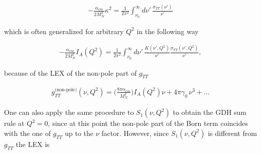 \documentclass[prc,twocolumn,showpacs,preprintnumbers,amsmath,amssymb
,superscriptaddress,a4paper,nofootinbib
]{revtex4-1}
\begin{document}
\begin{align}
-\frac{\alpha_{em}}{2 M_N^2}\kappa^2 = \frac{1}{2 \pi^2} \int_{\nu_0}^\infty \!\!\!\! d\nu'\,\frac{\sigma_{TT} (\nu')}{\nu'} \label{Eq:GDH-SumRule}
\end{align}


which is often generalized for arbitrary $Q^2$ in the following way

\begin{align}
-\frac{\alpha_{em}}{2 M_N^2}I_A(Q^2) = \frac{1}{2 \pi^2} \int_{\nu_0}^\infty \!\!\!\! d\nu'\, \frac{K(\nu',Q^2)}{\nu'} \frac{\sigma_{TT} (\nu',Q^2)}{\nu'}, \label{Eq:IA-SumRule}
\end{align}

because of the LEX of the non-pole part of $g_{TT}$

\begin{align}
g_{TT}^{\text{(non-pole)}}(\nu,Q^2) =  \Big( \frac{8 \pi\alpha_{em}}{M_N^2} \Big)  I_A(Q^2) \nu + 4\pi \gamma_0\, \nu^3 + \dots\label{Eq:LEX-gTTnp}
\end{align}




One can also apply the same procedure to $S_1(\nu,Q^2)$ to obtain the GDH sum rule at $Q^2=0$, since at this point the non-pole part of the Born term coincides with the one of $g_{TT}$ up to the $\nu$ factor. 
However, since  $S_1(\nu,Q^2)$ is different from $g_{TT}$ the LEX is 
\end{document}
